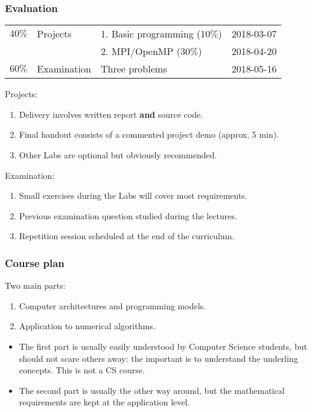 \begin{frame}
  \frametitle{Evaluation}

\begin{tabular}{|l|l|l|l|}
\hline
$40\%$ & Projects    & 1. Basic programming          ($10\%$) & 2018-03-07 \\
       &             & 2. MPI/OpenMP                 ($30\%$) & 2018-04-20 \\                        
$60\%$ & Examination & Three problems & 2018-05-16 \\
\hline 
\end{tabular}

\medskip
Projects:
\begin{enumerate}
\item Delivery involves written report \textbf{and} source code.
\item Final handout consists of a commented project demo (approx. 5 min).
\item Other Labs are optional but obviously recommended.
\end{enumerate}

\medskip
Examination:
\begin{enumerate}
\item Small exercises during the Labs will cover most requirements.
\item Previous examination question studied during the lectures.
\item Repetition session scheduled at the end of the curriculum.
\end{enumerate}

\end{frame}

\begin{frame}
  \frametitle{Course plan}

Two main parts:
\begin{enumerate}
\item Computer architectures and programming models.
\item Application to numerical algorithms.
\end{enumerate}

\medskip
\begin{itemize}
\item The first part is usually easily understood by Computer Science students, but should not scare others away: the important is to understand the underling concepts. This is not a CS course.
\item The second part is usually the other way around, but the mathematical requirements are kept at the application level.
\end{itemize}

\end{frame}


